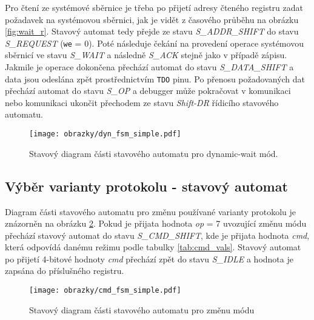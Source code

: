 Pro čtení ze systémové sběrnice je třeba po přijetí adresy čteného registru zadat požadavek na systémovou sběrnici, jak je vidět z časového průběhu na obrázku \ref{fig:wait_r}. Stavový automat tedy přejde ze stavu \textit{S\_ADDR\_SHIFT} do stavu \textit{S\_REQUEST} (\texttt{we} = 0). Poté následuje čekání na provedení operace systémovou sběrnicí ve stavu \textit{S\_WAIT} a následně \textit{S\_ACK} stejně jako v případě zápisu. Jakmile je operace dokončena přechází automat do stavu \textit{S\_DATA\_SHIFT} a data jsou odeslána zpět prostřednictvím \texttt{\acs{TDO}} pinu. Po přenosu požadovaných dat přechází automat do stavu \textit{S\_OP} a debugger může pokračovat v komunikaci nebo komunikaci ukončit přechodem ze stavu \textit{Shift-DR} řídicího stavového automatu.

\begin{figure}[H]
  \begin{center}
    \texttt{[image: obrazky/dyn\_fsm\_simple.pdf]}
  \end{center}
  \caption{Stavový diagram části stavového automatu pro dynamic-wait mód.}
	\label{fig:dyn_wait_fsm}
\end{figure}

\subsection{Výběr varianty protokolu - stavový automat} \label{subsec:cmd-fsm}
Diagram části stavového automatu pro změnu používané varianty protokolu je znázorněn na obrázku \ref{fig:cmd_fsm}. Pokud je přijata hodnota \textit{op} = 7 uvozující změnu módu přechází stavový automat do stavu \textit{S\_CMD\_SHIFT}, kde je přijata hodnota \textit{cmd}, která odpovídá danému režimu podle tabulky \ref{tab:cmd_vals}. Stavový automat po přijetí 4-bitové hodnoty \textit{cmd} přechází zpět do stavu \textit{S\_IDLE} a hodnota je zapsána do příslušného registru.

\begin{figure}[!h]
  \begin{center}
    \texttt{[image: obrazky/cmd\_fsm\_simple.pdf]}
  \end{center}
  \caption{Stavový diagram části stavového automatu pro změnu módu}
	\label{fig:cmd_fsm}
\end{figure}

